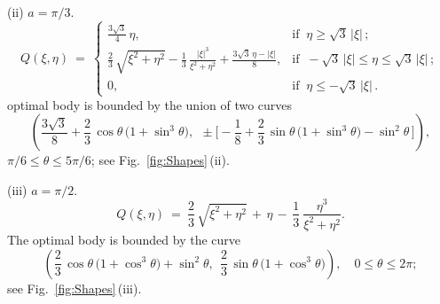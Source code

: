\documentclass[a4paper,12pt]{article}
\theoremstyle{remark}
\theoremstyle{definition}
\begin{document}
(ii) $a = \pi/3$.
$$ Q(\xi,\eta)\ =\
\left\{
\begin{array}{ll}
	\frac{3\sqrt{3}}{4}\, \eta, & \text{if } \ \eta \ge \sqrt{3}\, |\xi|\,;\\
	\frac{2}{3}\, \sqrt{\xi^2 + \eta^2} - \frac{1}{3}\, \frac{|\xi|^3}{\xi^2 + \eta^2} + \frac{3\sqrt{3}\, \eta - |\xi|}{8}, & \text{if } \ -\sqrt{3}\, |\xi| \le \eta \le \sqrt{3}\, |\xi|\,;\\
	0, & \text{if } \ \eta \le -\sqrt{3}\, |\xi|\,.
\end{array}
\right.
$$
optimal body is bounded by the union of two curves
$$
\left( \frac{3\sqrt{3}}{8} +
\frac{2}{3}\,\cos\theta\,\big(1 + \sin^3 \theta \big),
\ \ \pm\Big[ -\frac{1}{8}+
\frac{2}{3}\,\sin\theta\,\big(1 + \sin^3 \theta \big)
-\sin^2 \theta\, \Big] \right),
$$
$\pi/6 \le \theta \le 5\pi/6$; see Fig.~\ref{fig:Shapes}\,(ii).
\vspace{2mm}
	


(iii) $a = \pi/2$.
$$
Q(\xi,\eta)\ =\ \frac{2}{3}\, \sqrt{\xi^2 + \eta^2}\, +\, \eta\, -\, \frac{1}{3}\  \frac{\eta^3}{\xi^2 + \eta^2}.
$$
The optimal body is bounded by the curve
$$
\left(\frac{2}{3}\,\cos\theta\,\big(1 + \cos^3\theta \big)
+\sin^2\theta, \ \
\frac{2}{3}\,\sin\theta\,\big(1 + \cos^3\theta \big)\right), \quad 0 \le \theta \le 2\pi;
$$
see Fig.~\ref{fig:Shapes}\,(iii).
\end{document}
